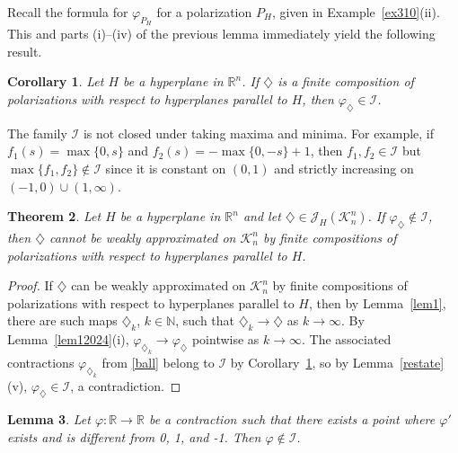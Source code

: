 \documentclass[12pt,reqno]{amsart}
\newcommand{\N}{{\mathbb N}}
\newcommand{\R}{{\mathbb R}}
\newcommand{\cI}{\mathcal I}
\newcommand{\cK}{\mathcal K}
\newcommand{\cJ}{\mathcal J}
\newtheorem{thm}{Theorem}[section]
\newtheorem{lem}[thm]{Lemma}
\newtheorem{cor}[thm]{Corollary}
\newcommand{\di}{\diamondsuit}
\numberwithin{equation}{section}
\begin{document}
Recall the formula for $\varphi_{P_H}$ for a polarization $P_H$, given in Example~\ref{ex310}(ii).  This and parts (i)--(iv) of the previous lemma immediately yield the following result.

\begin{cor}\label{cor313}
Let $H$ be a hyperplane in $\R^n$.  If $\di$ is a finite composition of polarizations with respect to hyperplanes parallel to $H$, then $\varphi_{\di}\in\cI$.
\end{cor}

The family $\cI$ is not closed under taking maxima and minima.  For example, if $f_1(s)=\max\{0,s\}$ and $f_2(s)=-\max\{0,-s\}+1$, then $f_1,f_2\in\mathcal{I}$ but $\max\{f_1,f_2\}\not\in\cI$ since it is constant on $(0,1)$ and strictly increasing on $(-1,0)\cup(1,\infty)$.

\begin{thm}\label{thmgpPrime}
Let $H$ be a hyperplane in $\R^n$ and let $\di\in \cJ_H(\cK_n^n)$.  If $\varphi_{\di}\not\in \cI$, then $\di$ cannot be weakly approximated on ${\cK}^n_n$ by finite compositions of polarizations with respect to hyperplanes parallel to $H$.
\end{thm}

\begin{proof}
If $\di$ can be weakly approximated on ${\cK}^n_n$ by finite compositions of polarizations with respect to hyperplanes parallel to $H$, then by Lemma~\ref{lem1}, there are such maps $\di_k$, $k\in \N$, such that $\di_k\to \di$ as $k\to\infty$.  By Lemma~\ref{lem12024}(i), $\varphi_{\di_k}\to \varphi_{\di}$ pointwise as $k\to \infty$.  The associated contractions $\varphi_{\di_k}$ from \eqref{ball} belong to $\cI$ by Corollary~\ref{cor313}, so by Lemma~\ref{restate}(v), $\varphi_{\di}\in\cI$, a contradiction.
\end{proof}

\begin{lem}\label{lem314}
Let $\varphi:\R\to\R$ be a contraction such that there exists a point where $\varphi'$ exists and is different from 0, 1, and -1.  Then $\varphi\not\in\cI$.
\end{lem}
\end{document}
